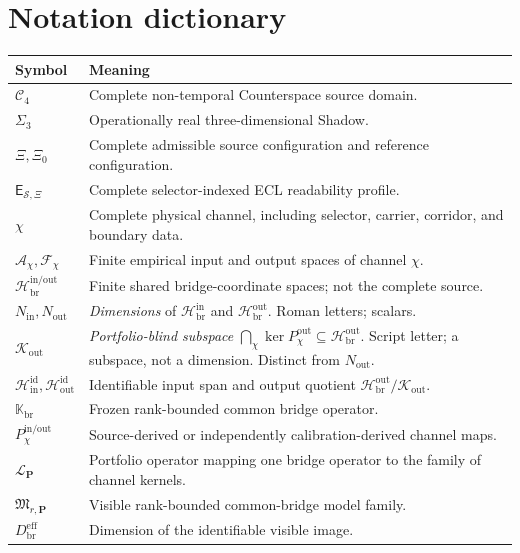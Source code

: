 \documentclass[11pt]{article}
\newcommand{\Cfour}{\mathcal{C}_{4}}
\newcommand{\Shadow}{\Sigma_{3}}
\newcommand{\Sset}{\mathcal{S}}
\newcommand{\ECL}{\mathsf{E}}
\newcommand{\Kout}{\mathcal{K}_{\mathrm{out}}}
\begin{document}
\section{Notation dictionary}
\label{app:notation}

\begin{tabularx}{\textwidth}{>{\raggedright\arraybackslash}p{}X}
\toprule
Symbol & Meaning \\
\midrule
\(\Cfour\) & Complete non-temporal Counterspace source domain. \\
\(\Shadow\) & Operationally real three-dimensional Shadow. \\
\(\Xi,\Xi_0\) & Complete admissible source configuration and reference configuration. \\
\(\ECL_{\Sset,\Xi}\) & Complete selector-indexed ECL readability profile. \\
\(\chi\) & Complete physical channel, including selector, carrier, corridor, and boundary data. \\
\(\mathcal A_{\chi},\mathcal F_{\chi}\) & Finite empirical input and output spaces of channel \(\chi\). \\
\(\mathcal H_{\mathrm{br}}^{\mathrm{in/out}}\) & Finite shared bridge-coordinate spaces; not the complete source. \\
\(N_{\mathrm{in}},N_{\mathrm{out}}\) & \emph{Dimensions} of \(\mathcal H_{\mathrm{br}}^{\mathrm{in}}\) and \(\mathcal H_{\mathrm{br}}^{\mathrm{out}}\). Roman letters; scalars. \\
\(\Kout\) & \emph{Portfolio-blind subspace} \(\bigcap_{\chi}\ker P_{\chi}^{\mathrm{out}}\subseteq\mathcal H_{\mathrm{br}}^{\mathrm{out}}\). Script letter; a subspace, not a dimension. Distinct from \(N_{\mathrm{out}}\). \\
\(\mathcal H_{\mathrm{in}}^{\mathrm{id}},\mathcal H_{\mathrm{out}}^{\mathrm{id}}\) & Identifiable input span and output quotient \(\mathcal H_{\mathrm{br}}^{\mathrm{out}}/\Kout\). \\
\(\mathbb K_{\mathrm{br}}\) & Frozen rank-bounded common bridge operator. \\
\(P_{\chi}^{\mathrm{in/out}}\) & Source-derived or independently calibration-derived channel maps. \\
\(\mathcal L_{\mathbf P}\) & Portfolio operator mapping one bridge operator to the family of channel kernels. \\
\(\mathfrak M_{r,\mathbf P}\) & Visible rank-bounded common-bridge model family. \\
\(D_{\mathrm{br}}^{\mathrm{eff}}\) & Dimension of the identifiable visible image. \\

\end{tabularx}
\end{document}
